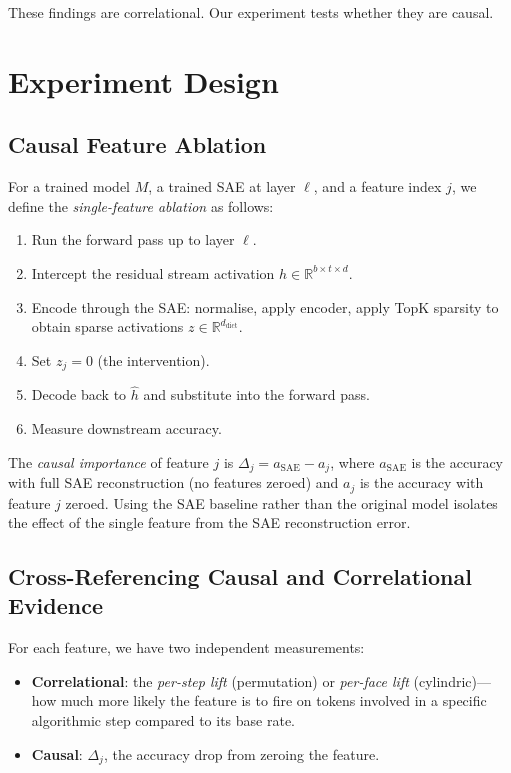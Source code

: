 \documentclass[10pt]{article}
\begin{document}
These findings are correlational. Our experiment tests whether they are
causal.

\section{Experiment Design}

\subsection{Causal Feature Ablation}

For a trained model $M$, a trained SAE at layer $\ell$, and a feature index
$j$, we define the \emph{single-feature ablation} as follows:

\begin{enumerate}
\item Run the forward pass up to layer $\ell$.
\item Intercept the residual stream activation $h \in \mathbb{R}^{b \times t
\times d}$.
\item Encode through the SAE: normalise, apply encoder, apply TopK sparsity
to obtain sparse activations $z \in \mathbb{R}^{d_{\text{dict}}}$.
\item Set $z_j = 0$ (the intervention).
\item Decode back to $\hat{h}$ and substitute into the forward pass.
\item Measure downstream accuracy.
\end{enumerate}

The \emph{causal importance} of feature $j$ is $\Delta_j = a_{\text{SAE}} -
a_j$, where $a_{\text{SAE}}$ is the accuracy with full SAE reconstruction
(no features zeroed) and $a_j$ is the accuracy with feature $j$ zeroed.
Using the SAE baseline rather than the original model isolates the effect of
the single feature from the SAE reconstruction error.

\subsection{Cross-Referencing Causal and Correlational Evidence}

For each feature, we have two independent measurements:

\begin{itemize}
\item \textbf{Correlational}: the \emph{per-step lift} (permutation) or
\emph{per-face lift} (cylindric)---how much more likely the feature is to
fire on tokens involved in a specific algorithmic step compared to its base
rate.

\item \textbf{Causal}: $\Delta_j$, the accuracy drop from zeroing the feature.
\end{itemize}
\end{document}
